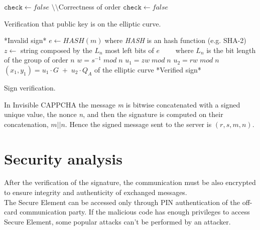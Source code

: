 \begin{itemize}
{\begin{algorithm}[h]
{	
$\mathtt{check}\gets false$\;
}
\BlankLine
$\setminus\setminus$Correctness of order\;
{	
$\mathtt{check}\gets false$\;
}
\caption{Verification that public key is on the elliptic curve.}\label{inv:ECDSA_key_verify}
\end{algorithm}
\begin{algorithm}[h]
\DontPrintSemicolon\footnotesize
{}
{*Invalid sign*}
\BlankLine
$e\gets HASH(m)\;$where \textit{HASH} is an hash function (e.g. SHA-2)\;
\BlankLine
$z \gets$ string composed by the $L_n$ most left bits of $e$\;
$\;\;\;\;\;\;\;$where $L_n$ is the bit length of the group of order $n$\;
\BlankLine
$w=s^{-1}\; mod\; n$\;
\BlankLine
$u_1 =zw\; mod\; n$\;
$u_2 =rw\; mod\; n$\;
$(x_1, y_1)=u_1\cdot G\;+\; u_2\cdot Q_{A}$ of the elliptic curve\;
\BlankLine
{}
{*Verified sign*}
\BlankLine
\caption{Sign verification.}\label{inv:ECDSA_verify}
\end{algorithm}
}
\end{itemize}
In Invisible CAPPCHA the message \textit{m} is bitwise concatenated with a signed unique value, the nonce \textit{n}, and then the signature is computed on their concatenation, $m||n$. Hence the signed message sent to the server is $(r, s, m, n)$.

\section{Security analysis}
After the verification of the signature, the communication must be also encrypted to ensure integrity and authenticity of exchanged messages.\\
The Secure Element can be accessed only through PIN authentication of the off-card communication party. If the malicious code has enough privileges to access Secure Element, some popular attacks can't be performed by an attacker.\\

